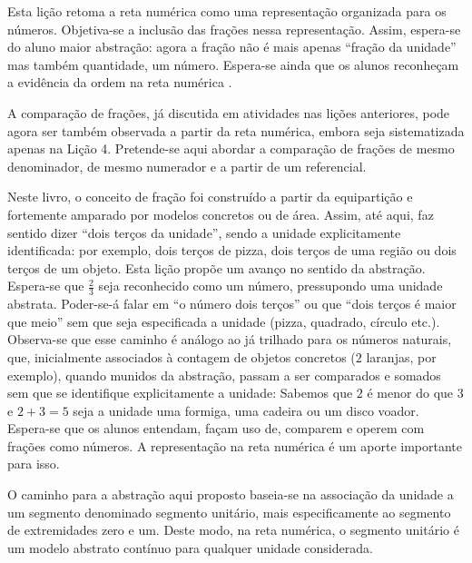 

\usetikzlibrary{decorations.pathreplacing}

\noindent {\color{special}{\Large \bf LIÇÃO 3 - Para o professor}}
\vspace{.5cm}

\begin{multicols}{2}
\noindent Esta lição retoma a reta numérica como uma representação organizada para os números. Objetiva-se a inclusão das frações nessa representação. Assim, espera-se do aluno maior abstração: agora a fração não é mais apenas ``fração da unidade'' mas também quantidade, um número. Espera-se ainda que os alunos reconheçam a evidência da ordem na reta numérica .

A comparação de frações, já discutida em atividades nas lições anteriores, pode agora ser também observada a partir da reta numérica, embora seja sistematizada apenas na Lição 4. Pretende-se aqui abordar a comparação de frações de mesmo denominador, de mesmo numerador e a partir de um referencial. 

Neste livro, o conceito de fração foi construído a partir da equipartição e fortemente amparado por modelos concretos ou de área. Assim, até aqui, faz sentido dizer ``dois terços da unidade'', sendo a unidade explicitamente identificada: por exemplo, dois terços de pizza, dois terços de uma região ou dois terços de um objeto. Esta lição propõe um avanço no sentido da abstração. Espera-se que $\frac{2}{3}$ seja reconhecido como um número, pressupondo uma unidade abstrata. Poder-se-á falar em ``o número dois terços'' ou que ``dois terços é maior que meio'' sem que seja especificada a unidade (pizza, quadrado, círculo etc.). Observa-se que esse caminho é análogo ao já trilhado para os números naturais, que, inicialmente associados à contagem de objetos concretos ($2$ laranjas, por exemplo), quando munidos da abstração, passam a ser comparados e somados sem que se identifique explicitamente a unidade: Sabemos que $2$ é menor do que $3$ e $2 + 3 = 5$ seja a unidade uma formiga, uma cadeira ou um disco voador. Espera-se que os alunos entendam, façam uso de, comparem e operem com frações como números. A representação na reta numérica é um aporte importante para isso.

O caminho para a abstração aqui proposto baseia-se na associação da unidade a um segmento denominado segmento unitário, mais especificamente ao segmento de extremidades zero e um. Deste modo, na reta numérica, o segmento unitário é um modelo abstrato contínuo para qualquer unidade considerada.
\vspace{.2cm}


\end{multicols}
